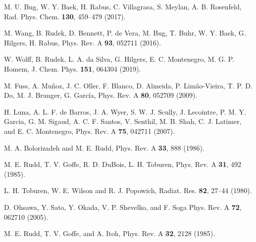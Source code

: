 \begin{thebibliography}{9}
M. U. Bug, W. Y. Baek, H. Rabus, C. Villagrasa, S. Meylan, A. B. Rosenfeld,
Rad. Phys. Chem. \textbf{130}, 459--479 (2017).

M. Wang, B. Rudek, D. Bennett, P. de Vera, M. Bug, T. Buhr, W. Y. Baek, 
G. Hilgers, H. Rabus, 
Phys. Rev. A \textbf{93}, 052711 (2016).

W. Wolff, B. Rudek, L. A. da Silva, G. Hilgers, E. C. Montenegro, 
M. G. P. Homem,
J. Chem. Phys. \textbf{151}, 064304 (2019).

M. Fuss, A. Muñoz, J. C. Oller, F. Blanco, D. Almeida, P. Limão-Vieira, 
T. P. D. Do, M. J. Brunger, G. Garc\'{i}a,
Phys. Rev. A \textbf{80}, 052709 (2009).

H. Luna, A. L. F. de Barros, J. A. Wyer, S. W. J. Scully, J. Lecointre, 
P. M. Y. Garcia, G. M. Sigaud, A. C. F. Santos, V. Senthil, M. B. Shah, 
C. J. Latimer, and E. C. Montenegro,
Phys. Rev. A \textbf{75}, 042711 (2007).

M. A. Bolorizadeh and M. E. Rudd, 
Phys. Rev. A \textbf{33}, 888 (1986). 

M. E. Rudd, T. V. Goffe, R. D. DuBois, L. H. Toburen, 
Phys. Rev. A \textbf{31}, 492 (1985). 

L. H. Toburen, W. E. Wilson and R. J. Popowich,
Radiat. Res. \textbf{82}, 27--44 (1980).

D. Ohsawa, Y. Sato, Y. Okada, V. P. Shevelko, and F. Soga
Phys. Rev. A \textbf{72}, 062710 (2005).

M. E. Rudd, T. V. Goffe, and A. Itoh, 
Phys. Rev. A \textbf{32}, 2128 (1985).



\end{thebibliography}
